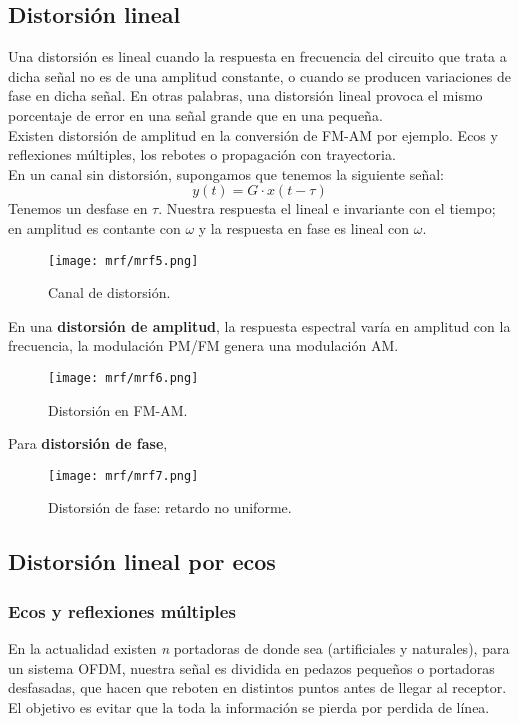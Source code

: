 \documentclass[
	12pt, %
	fleqn, %
	a4paper, %
	oneside, %
]{LegrandOrangeBook}
\begin{document}
\subsection{Distorsión lineal}
Una distorsión es lineal cuando la respuesta en frecuencia del circuito que trata a dicha
señal no es de una amplitud constante, o cuando se producen variaciones de fase en dicha señal.
En otras palabras, una distorsión lineal provoca el mismo porcentaje de error en una señal grande
que en una pequeña.\\
Existen distorsión de amplitud en la conversión de FM-AM por ejemplo. Ecos y reflexiones múltiples, los rebotes o propagación con trayectoria.\\
En un canal sin distorsión, supongamos que tenemos la siguiente señal:
\begin{displaymath}
y(t)=G\cdot x(t-\tau)
\end{displaymath}
Tenemos un desfase en $\tau$. Nuestra respuesta el lineal e invariante con el tiempo; en amplitud es contante con $\omega$ y la respuesta en fase es lineal con $\omega$.
\begin{figure}[H]
\centering
\texttt{[image: mrf/mrf5.png]}
\caption{Canal de distorsión.}
\end{figure}
En una \textbf{distorsión de amplitud}, la respuesta espectral varía en amplitud con la frecuencia, la modulación PM/FM genera una modulación AM. 
\begin{figure}[H]
\centering
\texttt{[image: mrf/mrf6.png]}
\caption{Distorsión en FM-AM.}
\end{figure}
Para \textbf{distorsión de fase}, 
\begin{figure}[H]
\centering
\texttt{[image: mrf/mrf7.png]}
\caption{Distorsión de fase: retardo no uniforme.}
\end{figure}
\subsection*{Distorsión lineal por ecos}
\subsubsection*{Ecos y reflexiones múltiples}
En la actualidad existen \textit{n} portadoras de donde sea (artificiales y naturales), para un sistema OFDM, nuestra señal es dividida en pedazos pequeños o portadoras desfasadas, que hacen que reboten en distintos puntos antes de llegar al receptor. El objetivo es evitar que la toda la información se pierda por perdida de línea.
\end{document}
